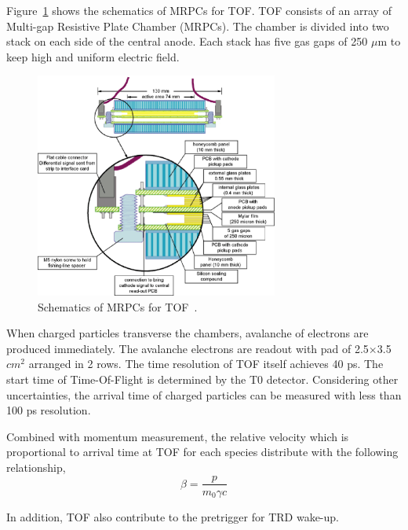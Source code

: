 Figure~\ref{fig_3_tofmrpc} shows the schematics of MRPCs for TOF. 
TOF consists of an array of Multi-gap Resistive Plate Chamber (MRPCs). 
The chamber is divided into two stack on each side of the central anode. 
Each stack has five gas gaps of 250 $\mu$m to keep high and uniform electric field. 
\begin{figure}
    \begin{center}
      \includegraphics[width=8cm]{chap3/figure/TOF/TOFMRPC.eps}
    \end{center}
  \caption{ 
    Schematics of MRPCs for TOF~\cite{bib_toftdr}.
  }
  \label{fig_3_tofmrpc}
\end{figure}
When charged particles transverse the chambers, avalanche of electrons are produced immediately. 
The avalanche electrons are readout with pad of 2.5$\times$3.5 $cm^{2}$ arranged in 2 rows.
The time resolution of TOF itself achieves 40 ps. 
The start time of Time-Of-Flight is determined by the T0 detector.
Considering other uncertainties, the arrival time of charged particles can be measured with less than 100 ps resolution. 

Combined with momentum measurement, the relative velocity which is proportional to arrival time at TOF for each species distribute with the following relationship, 
\begin{equation}
  \beta = \frac{p}{m_{0}\gamma c}
\end{equation}

In addition, TOF also contribute to the pretrigger for TRD wake-up. 

